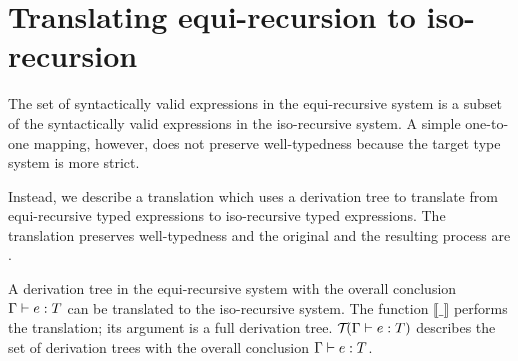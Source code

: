 \section{Translating equi-recursion to iso-recursion}

The set of syntactically valid expressions in the equi-recursive system is a
subset of the syntactically valid expressions in the iso-recursive system. A
simple one-to-one mapping, however, does not preserve well-typedness because
the target type system is more strict.

Instead, we describe a translation which uses a derivation tree to translate
from equi-recursive typed expressions to iso-recursive typed expressions. The
translation preserves well-typedness and the original and the resulting process
are . 

A derivation tree in the equi-recursive system with the overall conclusion
$\typing e T$ can be translated to the iso-recursive system. The function
$\llbracket \_ \rrbracket$ performs the translation; its argument is a full
derivation tree. $\derivTree e T$ describes the set of derivation trees with
the overall conclusion $\typing e T$.




